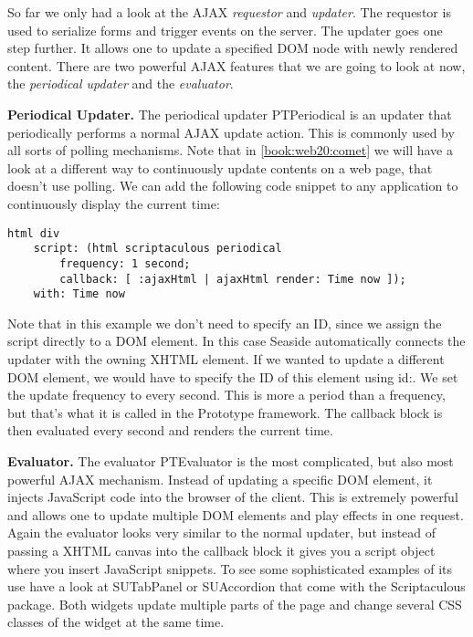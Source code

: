 \documentclass[a4paper,10pt,twoside]{book}
\newcommand{\ct}[1]{{\small\ttfamily\textup{#1}}}
\begin{document}
So far we only had a look at the AJAX \textit{requestor} and \textit{updater}. The requestor is used to serialize forms and trigger events on the server. The updater goes one step further. It allows one to update a specified DOM node with newly rendered content. There are two powerful AJAX features that we are going to look at now, the \textit{periodical updater} and the \textit{evaluator}.

\textbf{Periodical Updater.} The periodical updater  \ct{PTPeriodical} is an updater that periodically performs a normal AJAX update action. This is commonly used by all sorts of polling mechanisms. Note that in \autoref{book:web20:comet} we will have a look at a different way to continuously update contents on a web page, that doesn't use polling. We can add the following code snippet to any application to continuously display the current time:

\begin{lstlisting}
html div
    script: (html scriptaculous periodical
        frequency: 1 second;
        callback: [ :ajaxHtml | ajaxHtml render: Time now ]);
    with: Time now
\end{lstlisting}

Note that in this example we don't need to specify an ID, since we assign the script directly to a DOM element. In this case Seaside automatically connects the updater with the owning XHTML element. If we wanted to update a different DOM element, we would have to specify the ID of this element using \ct{id:}. We set the update frequency to every second. This is more a period than a frequency, but that's what it is called in the Prototype framework. The callback block is then evaluated every second and renders the current time.

\textbf{Evaluator.} The evaluator  \ct{PTEvaluator} is the most complicated, but also most powerful AJAX mechanism. Instead of updating a specific DOM element, it injects JavaScript code into the browser of the client. This is extremely powerful and allows one to update multiple DOM elements and play effects in one request. Again the evaluator looks very similar to the normal updater, but instead of passing a XHTML canvas into the callback block it gives you a script object where you insert JavaScript snippets. To see some sophisticated examples of its use have a look at  \ct{SUTabPanel} or  \ct{SUAccordion} that come with the Scriptaculous package. Both widgets update multiple parts of the page and change several CSS classes of the widget at the same time.
\end{document}
